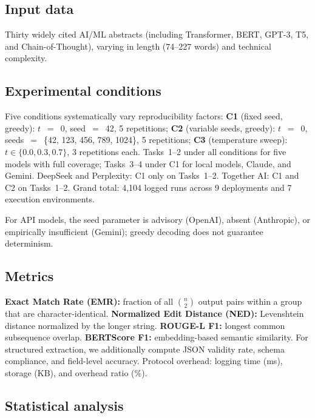 \documentclass[sn-nature]{sn-jnl}
\begin{document}
\subsection{Input data}\label{subsec:input}

Thirty widely cited AI/ML abstracts (including Transformer, BERT, GPT-3, T5, and Chain-of-Thought\cite{vaswani2017attention,devlin2019bert,brown2020language,raffel2020exploring,wei2022chain}), varying in length (74--227 words) and technical complexity.


\subsection{Experimental conditions}\label{subsec:conditions}

Five conditions systematically vary reproducibility factors:
\textbf{C1} (fixed seed, greedy): $t$~$=$~0, seed~$=$~42, 5 repetitions;
\textbf{C2} (variable seeds, greedy): $t$~$=$~0, seeds~$=$~\{42, 123, 456, 789, 1024\}, 5 repetitions;
\textbf{C3} (temperature sweep): $t \in \{0.0, 0.3, 0.7\}$, 3 repetitions each.
Tasks~1--2 under all conditions for five models with full coverage; Tasks~3--4 under C1 for local models, Claude, and Gemini.
DeepSeek and Perplexity: C1 only on Tasks~1--2.
Together AI: C1 and C2 on Tasks~1--2.
Grand total: 4,104 logged runs across 9 deployments and 7 execution environments.

For API models, the seed parameter is advisory (OpenAI\cite{openai2024seed}), absent (Anthropic), or empirically insufficient (Gemini); greedy decoding does not guarantee determinism\cite{ouyang2024nondeterminism}.


\subsection{Metrics}\label{subsec:metrics}

\textbf{Exact Match Rate (EMR):} fraction of all $\binom{n}{2}$ output pairs within a group that are character-identical.
\textbf{Normalized Edit Distance (NED):} Levenshtein distance\cite{levenshtein1966binary} normalized by the longer string.
\textbf{ROUGE-L F1:} longest common subsequence overlap\cite{lin2004rouge}.
\textbf{BERTScore F1:} embedding-based semantic similarity\cite{zhang2020bertscore}.
For structured extraction, we additionally compute JSON validity rate, schema compliance, and field-level accuracy.
Protocol overhead: logging time (ms), storage (KB), and overhead ratio (\%).


\subsection{Statistical analysis}\label{subsec:stats}
\end{document}

